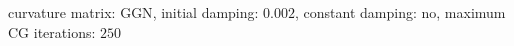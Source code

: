 curvature matrix: $\text{GGN}$, initial damping: $\num[scientific-notation=true]{0.002}$, constant damping: $\text{no}$, maximum CG iterations: $\num[scientific-notation=false]{250}$